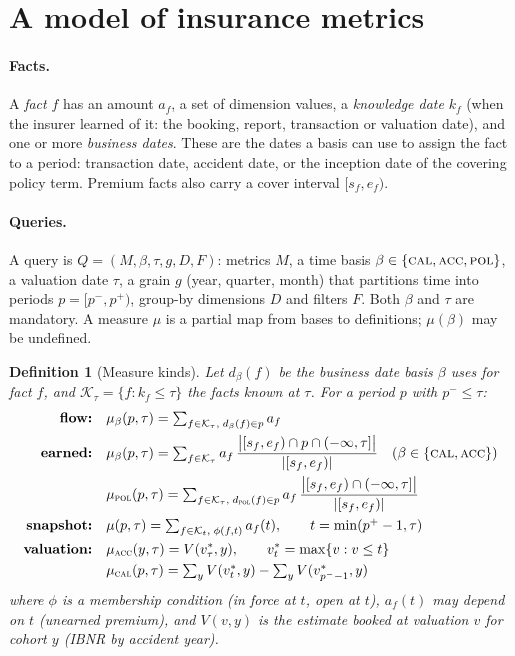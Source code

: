 \documentclass[11pt]{article}
\newtheorem{definition}{Definition}
\begin{document}
\section{A model of insurance metrics}\label{sec:model}

\paragraph{Facts.}
A \emph{fact} $f$ has an amount $a_f$, a set of dimension values, a \emph{knowledge date} $k_f$ (when the insurer
learned of it: the booking, report, transaction or valuation date), and one or more \emph{business dates}. These
are the dates a basis can use to assign the fact to a period: transaction date, accident date, or the inception
date of the covering policy term. Premium facts also carry a cover interval $[s_f, e_f)$.

\paragraph{Queries.}
A query is $Q = (M, \beta, \tau, g, D, F)$: metrics $M$, a time basis $\beta \in
\{\textsc{cal}, \textsc{acc}, \textsc{pol}\}$, a valuation date $\tau$, a grain $g$ (year, quarter, month) that
partitions time into periods $p = [p^-, p^+)$, group-by dimensions $D$ and filters $F$. Both $\beta$ and $\tau$
are mandatory. A measure $\mu$ is a partial map from bases to definitions; $\mu(\beta)$ may be undefined.

\begin{definition}[Measure kinds]
Let $d_\beta(f)$ be the business date basis $\beta$ uses for fact $f$, and $\mathcal{K}_\tau = \{f : k_f \le
\tau\}$ the facts known at $\tau$. For a period $p$ with $p^- \le \tau$:
\begin{align*}
\textbf{flow:}\quad & \mu_\beta(p,\tau) = \textstyle\sum_{f \in \mathcal{K}_\tau,\; d_\beta(f) \in p} a_f \\
\textbf{earned:}\quad & \mu_\beta(p,\tau) = \textstyle\sum_{f \in \mathcal{K}_\tau} a_f \,
  \dfrac{\big|[s_f, e_f) \cap p \cap (-\infty, \tau]\big|}{|[s_f, e_f)|}
  \quad (\beta \in \{\textsc{cal},\textsc{acc}\}) \\
& \mu_{\textsc{pol}}(p,\tau) = \textstyle\sum_{f \in \mathcal{K}_\tau,\; d_{\textsc{pol}}(f) \in p} a_f \,
  \dfrac{\big|[s_f, e_f) \cap (-\infty, \tau]\big|}{|[s_f, e_f)|} \\
\textbf{snapshot:}\quad & \mu(p,\tau) = \textstyle\sum_{f \in \mathcal{K}_{t},\; \phi(f, t)} a_f(t),
  \qquad t = \min(p^+ - 1, \tau) \\
\textbf{valuation:}\quad & \mu_{\textsc{acc}}(y,\tau) = V(v^*_\tau, y), \qquad v^*_t = \max\{v : v \le t\} \\
& \mu_{\textsc{cal}}(p,\tau) = \textstyle\sum_y V(v^*_{t}, y) - \sum_y V(v^*_{p^- - 1}, y)
\end{align*}
where $\phi$ is a membership condition (in force at $t$, open at $t$), $a_f(t)$ may depend on $t$ (unearned
premium), and $V(v, y)$ is the estimate booked at valuation $v$ for cohort $y$ (IBNR by accident year).
\end{definition}
\end{document}
